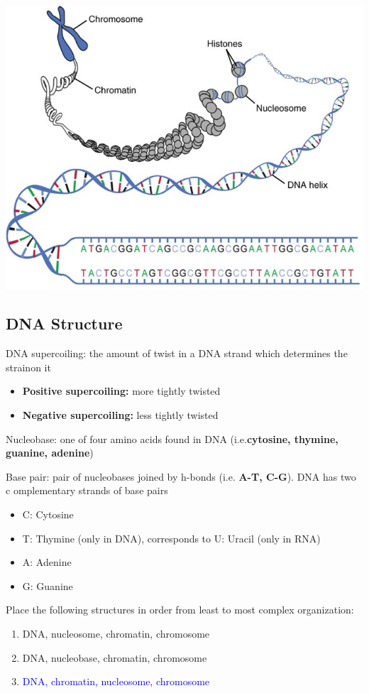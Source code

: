 \documentclass[11pt,fleqn]{book} %
\begin{document}
\begin{center}
    \includegraphics[width=0.65\linewidth]{Pictures/Screenshot 2024-02-25 182833.png}
\end{center}
\subsection{DNA Structure}
\begin{descriptions}
    \item[DNA supercoiling:] the amount of twist in a DNA strand which determines the strainon it
    \begin{itemize}
        \item \textbf{Positive supercoiling:} more tightly twisted
        \item \textbf{Negative supercoiling:} less tightly twisted
    \end{itemize}
    \item[Nucleobase:] one of four amino acids found in DNA (i.e.\textbf{cytosine, thymine, guanine, adenine})
    \item[Base pair:] pair of nucleobases joined by h-bonds (i.e. \textbf{A-T, C-G}). DNA has two c omplementary strands of base pairs
    \begin{itemize}
        \item C: Cytosine
        \item T: Thymine (only in DNA), corresponds to U: Uracil (only in RNA)
        \item A: Adenine
        \item G: Guanine
    \end{itemize}
\end{descriptions}
\begin{exercise}
    Place the following structures in order from least to most complex organization:
    \begin{enumerate}
        \item DNA, nucleosome, chromatin, chromosome
        \item DNA, nucleobase, chromatin, chromosome
        \item \textcolor{blue}{DNA, chromatin, nucleosome, chromosome}
    \end{enumerate}
\end{exercise}
\end{document}
